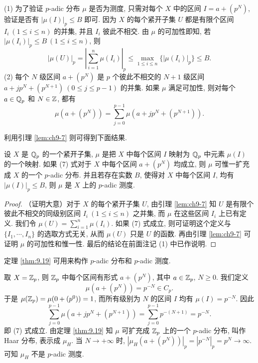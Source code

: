 \begin{remark}
(1) 为了验证 $p$-adic 分布 $\mu$ 是否为测度, 只需对每个 $X$ 中的区间 $I=a+(p^N)$, 验证是否有 $|\mu(I)|_p\leqslant B$ 即可. 因为 $X$ 的每个紧开子集 $U$ 都是有限个区间 $I_i\ (1\leqslant i\leqslant n)$ 的并集, 并且 $I_i$ 彼此不相交. 由 $\mu$ 的可加性即知, 若 $|\mu(I_i)|_p\leqslant B\ (1\leqslant i\leqslant n)$, 则
\[
  |\mu(U)|_p=\left|\sum_{i=1}^{n}\mu(I_i)\right|_p
  \leqslant\max_{1\leqslant i\leqslant n}\{|\mu(I_i)|_p\}\leqslant B.
\]
(2) 每个 $N$ 级区间 $a+(p^N)$ 是 $p$ 个彼此不相交的 $N+1$ 级区间 $a+jp^N+(p^{N+1})\ (0\leqslant j\leqslant p-1)$ 的并集. 如果 $\mu$ 满足可加性, 则对每个 $a\in\mathbb{Q}_p$ 和 $N\in\mathbb{Z}$, 都有
\begin{equation}\tag{7}
  \mu(a+(p^N))=\sum_{j=0}^{p-1}\mu(a+jp^N+(p^{N+1})).
\end{equation}
\end{remark}

利用引理 \ref{lem:ch9-7} 则可得到下面结果.

\begin{theorem}\label{thm:9.19}
设 $X$ 是 $\mathbb{Q}_p$ 的一个紧开子集, $\mu$ 是把 $X$ 中每个区间 $I$ 映射为 $\mathbb{Q}_p$ 中元素 $\mu(I)$ 的一个映射. 如果 (7) 式对于 $X$ 中每个区间 $a+(p^N)$ 均成立, 则 $\mu$ 可惟一扩充成 $X$ 的一个 $p$-adic 分布. 并且若存在实数 $B$, 使得对 $X$ 中每个区间 $I$, 均有 $|\mu(I)|_p\leqslant B$, 则 $\mu$ 是 $X$ 上的 $p$-adic 测度.
\end{theorem}

\begin{proof}
（证明大意）对于 $X$ 的每个紧开子集 $U$, 由引理 \ref{lem:ch9-7} 知 $U$ 是有限个彼此不相交的同级别区间 $I_i\ (1\leqslant i\leqslant n)$ 之并集, 而 $\mu$ 在这些区间 $I_i$ 上已有定义. 我们令 $\mu(U)=\sum_{i=1}^{n}\mu(I_i)$. 如果 (7) 式成立, 则可证明这个定义与 $\{I_1,\cdots,I_n\}$ 的选取方式无关, 从而 $\mu(U)$ 只是 $U$ 的函数. 再由引理 \ref{lem:ch9-7} 可证明 $\mu$ 的可加性和惟一性. 最后的结论在前面注记 (1) 中已作说明.
\end{proof}

定理 \ref{thm:9.19} 可用来构作 $p$-adic 分布和 $p$-adic 测度.

\begin{example}
取 $X=\mathbb{Z}_p$, 则 $\mathbb{Z}_p$ 中每个区间有形式 $a+(p^N)$, 其中 $a\in\mathbb{Z}_p$, $N\geqslant 0$. 我们定义
\[
  \mu(a+(p^N))=p^{-N}\in C_p.
\]
于是 $\mu(\mathbb{Z}_p)=\mu(0+(p^0))=1$, 而所有级别为 $N$ 的区间 $I$ 均有 $\mu(I)=p^{-N}$. 因此
\[
  \sum_{j=0}^{p-1}\mu(a+jp^N+(p^{N+1}))
  =\sum_{j=0}^{p-1}p^{-(N+1)}=p^{-N}.
\]
即 (7) 式成立. 由定理 \ref{thm:9.19} 知 $\mu$ 可扩充成 $\mathbb{Z}_p$ 上的一个 $p$-adic 分布, 叫作 Haar 分布, 表示成 $\mu_H$. 当 $N\to+\infty$ 时, $\left|\mu_H(a+(p^N))\right|_p=\left|p^{-N}\right|_p=p^N\to\infty$. 可知 $\mu_H$ 不是 $p$-adic 测度.
\end{example}

